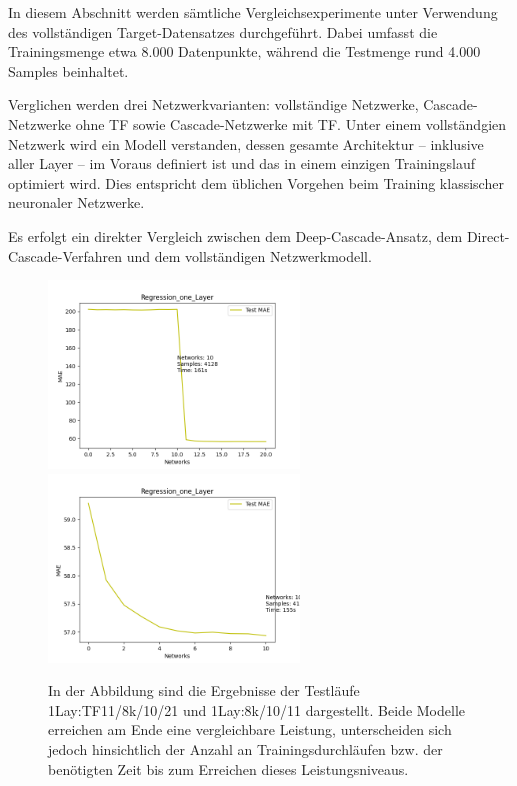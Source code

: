 In diesem Abschnitt werden sämtliche Vergleichsexperimente unter Verwendung des vollständigen Target-Datensatzes durchgeführt. Dabei umfasst die 
Trainingsmenge etwa 8.000 Datenpunkte, während die Testmenge rund 4.000 Samples beinhaltet.

Verglichen werden drei Netzwerkvarianten: vollständige Netzwerke, Cascade-Netzwerke ohne TF sowie 
Cascade-Netzwerke mit TF. Unter einem vollständgien Netzwerk wird ein Modell verstanden, dessen gesamte Architektur – inklusive 
aller Layer – im Voraus definiert ist und das in einem einzigen Trainingslauf optimiert wird. Dies entspricht dem üblichen Vorgehen beim 
Training klassischer neuronaler Netzwerke.

Es erfolgt ein direkter Vergleich zwischen dem Deep-Cascade-Ansatz, dem Direct-Cascade-Verfahren und dem vollständigen Netzwerkmodell.

\begin{figure}[htpb]
    \includegraphics[height=5cm]{../../Plots/ba_plots/regression_large/onelayer_ts.png}
    \includegraphics[height=5cm]{../../Plots/ba_plots/regression_large/woonelayer_ts.png}
    \caption{\label{fig:largeregr2} 
    \small{In der Abbildung sind die Ergebnisse der Testläufe 1Lay:TF11/8k/10/21 und 1Lay:8k/10/11 dargestellt. Beide Modelle erreichen am Ende 
    eine vergleichbare Leistung, unterscheiden sich jedoch hinsichtlich der Anzahl an Trainingsdurchläufen bzw. der benötigten Zeit bis zum 
    Erreichen dieses Leistungsniveaus.}}
\end{figure}

